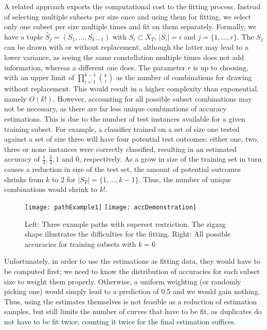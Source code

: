 A related approach exports the computational cost to the fitting process. Instead of selecting multiple subsets per size once and using them for fitting, we select only one subset per size multiple times and fit on them separately. Formally, we have a tuple $\tilde{S_j} = (S_1,...,S_{k-1})$ with $S_i \subset X_T$, $|S_i| = i$ and $j = \{1,...,r\}$. The $S_j$ can be drawn with or without replacement, although the latter may lead to a lower variance, as seeing the same constellation multiple times does not add information, whereas a different one does. The parameter $r$ is up to choosing, with an upper limit of $\prod_{i=1}^{k-1} {k \choose i}$ as the number of combinations for drawing without replacement. This would result in a higher complexity than exponential, namely $O(k!)$. However, accounting for all possible subset combinations may not be necessary, as there are far less unique combinations of accuracy estimations. This is due to the number of test instances available for a given training subset. For example, a classifier trained on a set of size one tested against a set of size three will have four potential test outcomes: either one, two, three or none instances were correctly classified, resulting in an estimated accuracy of $\frac{1}{3}, \frac{2}{3}, 1$ and $0$, respectively. As a grow in size of the training set in turn causes a reduction in size of the test set, the amount of potential outcomes shrinks from $k$ to $2$ for $|S_T| = \{1, ..., k-1\}$. Thus, the number of unique combinations would shrink to $k!$.

\begin{figure}[h]
	\centering
	\texttt{[image: pathExample1]}
	\texttt{[image: accDemonstration]}
	\caption{Left: Three example paths with superset restriction. The zigzag shape illustrates the difficulties for the fitting. Right: All possible accuracies for training subsets with $k = 6$}
	\label{fig:pathAccExamples}
\end{figure}

Unfortunately, in order to use the estimations as fitting data, they would have to be computed first; we need to know the distribution of accuracies for each subset size to weight them properly. Otherwise, a uniform weighting (or randomly picking one) would simply lead to a prediction of 0.5 and we would gain nothing. Thus, using the estimates themselves is not feasible as a reduction of estimation samples, but still limits the number of curves that have to be fit, as duplicates do not have to be fit twice; counting it twice for the final estimation suffices.


